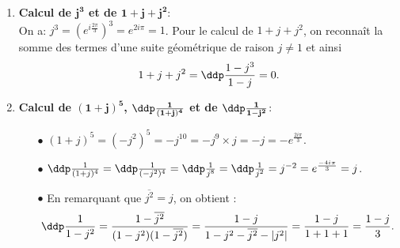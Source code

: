 
\begin{correction}   \;
\begin{enumerate}
\item \textbf{Calcul de $\mathbf{j^3}$ et de $\mathbf{1+j+j^2}$}:\\
\noindent On a: $j^3=\left(  e^{i\frac{2\pi}{3}} \right)^3=e^{2i\pi}=1$. Pour le calcul de $1+j+j^2$, on reconna\^{i}t la somme des termes d'une suite g\'eom\'etrique de raison $j\not= 1$ et ainsi
$$1+j+j^2=\ddp\frac{1-j^3}{1-j}=0.$$
\item \textbf{Calcul de $\mathbf{(1+j)^5}$, $\mathbf{\ddp\frac{1}{(1+j)^4}}$ et de $\mathbf{\ddp\frac{1}{1-j^2}}$}:
\begin{itemize}
\item[$\bullet$] $(1+j)^5= (-j^2)^5= -j^{10}=-j^9\times j=-j=-e^{\frac{2i\pi}{3}}$.
\item[$\bullet$] $\ddp\frac{1}{(1+j)^4}=\ddp\frac{1}{(-j^2)^4}=\ddp\frac{1}{j^8}=\ddp\frac{1}{j^2}=j^{-2}=e^{\frac{-4i\pi}{3}}=j$.
\item[$\bullet$] En remarquant que $\overline{j^2}=j$, on obtient :
$$\ddp\frac{1}{1-j^2}= \frac{1-\overline{j^2}}{(1-j^2)(1-\overline{j^2})} = \frac{1-j}{1-j^2-\overline{j^2}-|j^2|} = \frac{1-j}{1+1+1} = \frac{1-j}{3}.$$
\end{itemize}
\end{enumerate}
\end{correction}